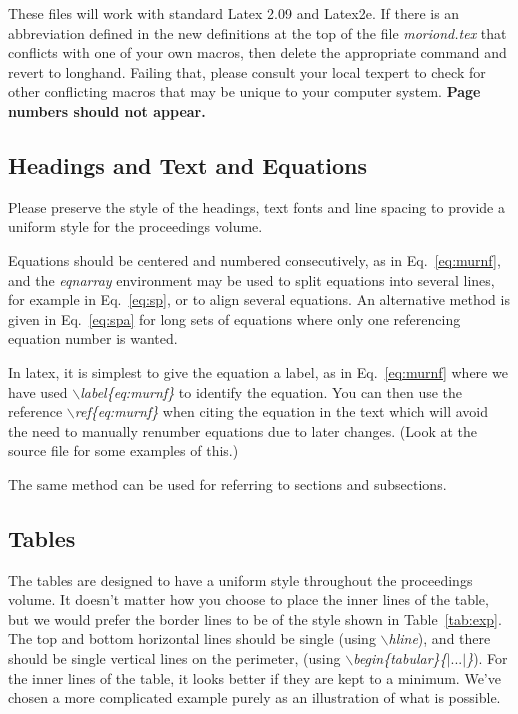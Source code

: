 \documentclass[11pt]{article}
\begin{document}
These files will work with standard Latex 2.09 and Latex2e.
If there is an abbreviation
defined in the new definitions at the top of the file {\em moriond.tex} that
conflicts with one of your own macros, then
delete the appropriate command and revert to longhand. Failing that, please
consult your local texpert to check for other conflicting macros that may
be unique to your computer system.
{\bf Page numbers should not appear.}

\subsection{Headings and Text and Equations}

Please preserve the style of the
headings, text fonts and line spacing to provide a
uniform style for the proceedings volume.

Equations should be centered and numbered consecutively, as in
Eq.~\ref{eq:murnf}, and the {\em eqnarray} environment may be used to
split equations into several lines, for example in Eq.~\ref{eq:sp},
or to align several equations.
An alternative method is given in Eq.~\ref{eq:spa} for long sets of
equations where only one referencing equation number is wanted.

In latex, it is simplest to give the equation a label, as in
Eq.~\ref{eq:murnf}
where we have used {\em $\backslash$label\{eq:murnf\}} to identify the
equation. You can then use the reference {\em $\backslash$ref\{eq:murnf\}}
when citing the equation in the
text which will avoid the need to manually renumber equations due to
later changes. (Look at
the source file for some examples of this.)

The same method can be used for referring to sections and subsections.

\subsection{Tables}

The tables are designed to have a uniform style throughout the proceedings
volume. It doesn't matter how you choose to place the inner
lines of the table, but we would prefer the border lines to be of the style
shown in Table~\ref{tab:exp}.
 The top and bottom horizontal
lines should be single (using {\em $\backslash$hline}), and
there should be single vertical lines on the perimeter,
(using {\em $\backslash$begin\{tabular\}\{$|...|$\}}).
 For the inner lines of the table, it looks better if they are
kept to a minimum. We've chosen a more complicated example purely as
an illustration of what is possible.
\end{document}
